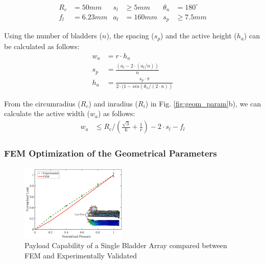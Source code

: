 \documentclass[letterpaper, 10 pt, conference]{ieeeconf}  %
\begin{document}
\begin{align*}
R_c &= 50mm    &  s_l &\geq 5mm      &  \theta_n&=180^\circ\\
f_l&=6.23mm         &  a_l&=160mm   &  s_p&\geq7.5mm
\label{eq:constraints}
\end{align*}

Using the number of bladders ($n$), the spacing ($s_{p}$) and the active height ($h_{a}$) can be calculated as follows:
\begin{align} 
w_a &= r\cdot h_a \\
s_p &=  \frac{(a_{l} - 2\cdot(a_l/n))}{n} \\ 
h_a &=  \frac{s_p \cdot \pi}{2\cdot(1-sin(\theta_n/(2\cdot n))} \label{eq:wa_sp_ha}
\end{align}

From the circumradius ($R_c$) and inradius ($R_i$) in Fig. \ref{fig:geom_param}b), we can calculate the active width ($w_a$) as follows:
\begin{align} 
w_a &\leq  R_c/(\frac{\sqrt{3}}{6} + \frac{1}{r}) - 2\cdot s_l -f_l \label{eq:wa_ha}
\end{align}

\subsubsection{FEM Optimization of the Geometrical Parameters}

\begin{figure}[b!]
\centering
\includegraphics[width=0.45\textwidth]{Figures/single_FEM_REAL}
\caption{Payload Capability of a Single Bladder Array compared between FEM and Experimentally Validated}
\label{fig:single_fem_real}
\vspace{-1.5em}
\end{figure}
\end{document}
